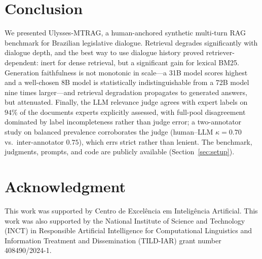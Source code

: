 \documentclass[conference]{IEEEtran}
\begin{document}
\section{Conclusion}
We presented Ulysses-MTRAG, a human-anchored synthetic multi-turn RAG benchmark
for Brazilian legislative dialogue. Retrieval degrades significantly with dialogue
depth, and the best way to use dialogue history proved retriever-dependent: inert
for dense retrieval, but a significant gain for lexical BM25. Generation faithfulness is not monotonic in scale---a 31B model scores highest
and a well-chosen 8B model is statistically indistinguishable from a 72B model
nine times larger---and retrieval degradation propagates to generated answers,
but attenuated. Finally, the
LLM relevance judge agrees with expert labels on $94\%$ of the documents experts
explicitly assessed, with full-pool disagreement dominated by label incompleteness
rather than judge error; a two-annotator study on balanced prevalence
corroborates the judge (human--LLM $\kappa{=}0.70$ vs.\ inter-annotator $0.75$),
which errs strict rather than lenient. The benchmark, judgments, prompts, and
code are publicly available (Section~\ref{sec:setup}).

\section*{Acknowledgment}
This work was supported by Centro de Excel\^encia em Intelig\^encia
Artificial. This work was also supported by the National Institute of
Science and Technology (INCT) in Responsible Artificial Intelligence for
Computational Linguistics and Information Treatment and Dissemination
(TILD-IAR) grant number 408490/2024-1.



\end{document}
